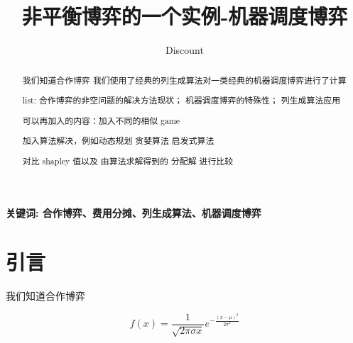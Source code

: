\documentclass[UTF8]{article}
\author {Discount}
\title {非平衡博弈的一个实例-机器调度博弈}
\date{}
\begin{document}
    \maketitle

\begin{abstract}
    我们知道合作博弈
    我们使用了经典的列生成算法对一类经典的机器调度博弈进行了计算

list: 合作博弈的非空问题的解决方法现状；
      机器调度博弈的特殊性；
      列生成算法应用


可以再加入的内容：加入不同的相似 game

                加入算法解决，例如动态规划  贪婪算法  启发式算法

                对比 shapley 值以及 由算法求解得到的 分配解  进行比较 

\end{abstract}

\qquad \textbf{关键词: 合作博弈、费用分摊、列生成算法、机器调度博弈}

\section{引言}

我们知道合作博弈




$$
f(x)=\frac{1}{\sqrt{2 \pi \sigma x}} e^{-\frac{(x-\mu)^{2}}{2 \sigma^{2}}}
$$
\end{document}
